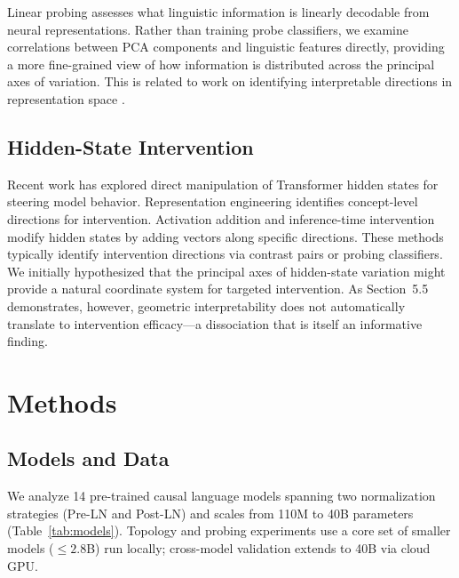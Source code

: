 \documentclass[11pt,a4paper]{article}
\begin{document}
Linear probing \citep{alain2017understanding,hewitt2019structural,tenney2019bert} assesses what linguistic information is linearly decodable from neural representations. Rather than training probe classifiers, we examine correlations between PCA components and linguistic features directly, providing a more fine-grained view of how information is distributed across the principal axes of variation. This is related to work on identifying interpretable directions in representation space \citep{park2024linear,marks2024geometry}.

\subsection{Hidden-State Intervention}

Recent work has explored direct manipulation of Transformer hidden states for steering model behavior. Representation engineering \citep{zou2023representation} identifies concept-level directions for intervention. Activation addition \citep{turner2024activation} and inference-time intervention \citep{li2024inference} modify hidden states by adding vectors along specific directions. These methods typically identify intervention directions via contrast pairs or probing classifiers. We initially hypothesized that the principal axes of hidden-state variation might provide a natural coordinate system for targeted intervention. As Section~5.5 demonstrates, however, geometric interpretability does not automatically translate to intervention efficacy---a dissociation that is itself an informative finding.

\section{Methods}

\subsection{Models and Data}

We analyze 14 pre-trained causal language models spanning two normalization strategies (Pre-LN and Post-LN) and scales from 110M to 40B parameters (Table~\ref{tab:models}). Topology and probing experiments use a core set of smaller models ($\leq 2.8$B) run locally; cross-model validation extends to 40B via cloud GPU.
\end{document}
